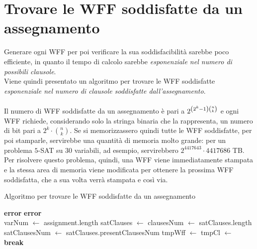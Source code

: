 \section{Trovare le WFF soddisfatte da un assegnamento}
Generare ogni WFF per poi verificare la sua soddisfacibilità sarebbe 
poco efficiente, in quanto il tempo di calcolo sarebbe \textit{esponenziale nel numero
di possibili clausole}.\\
Viene quindi presentato un algoritmo per trovare le WFF soddisfatte
\textit{esponenziale nel numero di clausole soddisfatte dall'assegnamento}.\\
\\
Il numero di WFF soddisfatte da un assegnamento è pari a $2^{\left(2^k - 1\right) \binom{n}{k}}$
e ogni WFF richiede, considerando solo la stringa binaria che la rappresenta,
un numero di bit pari a $2^k \cdot \binom{n}{k}$.
Se si memorizzassero quindi tutte le WFF soddisfatte, per poi stamparle, servirebbe
una quantità di memoria molto grande: per un problema $5$-SAT su 30 variabili, ad
esempio, servirebbero $2^{4417643} \cdot 4417686$ TB.
Per risolvere questo problema, quindi, una WFF viene immediatamente 
stampata e la stessa area di memoria viene modificata per 
ottenere la prossima WFF soddisfatta, che a sua volta verrà stampata e così via.
\begin{algorithm} [H]
    \caption{Algoritmo per trovare le WFF soddisfatte da un assegnamento}
    \label{alg:find_sat_wff}
    \begin{algorithmic}[1]
                \State \textbf{error}
            \EndIf
                \State \textbf{error}
            \EndIf\\

            \State varNum $\gets$ assignment.length
            \State satClauses $\gets$ 
            \State clausesNum $\gets$ satClauses.length
            \State satClausesNum $\gets$ satClauses.presentClausesNum
            \State tmpWff $\gets$ 
            \State tmpCl $\gets$ \\
            
                \State {}
                \State {}
                            \State {} 
                        \Else                    
                            \State {}
                            \State \textbf{break}
                        \EndIf
                    \EndIf
                    \State {}
                \EndFor
            \EndFor
        \EndProcedure
    \end{algorithmic}
\end{algorithm}
